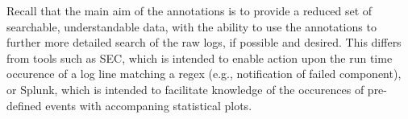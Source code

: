 Recall that the main aim of the annotations
is to provide a reduced set of searchable, understandable data, with the
ability to use the annotations to further more detailed search of the raw
logs, if possible and desired. This differs from tools
such as SEC, which is intended to enable action upon the run time
occurence of a log line matching a regex (e.g., notification
of failed component), or Splunk, which is intended
to facilitate knowledge of the occurences of pre-defined
events with accompaning statistical plots.











